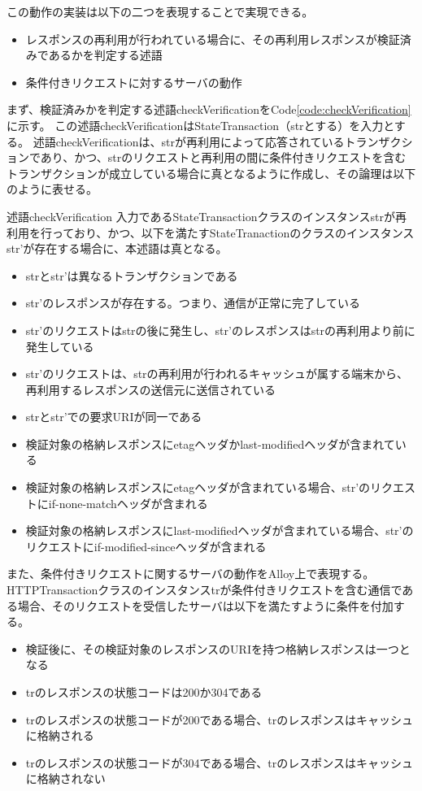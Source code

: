 \documentclass[journal]{IEEEtran}
\begin{document}
この動作の実装は以下の二つを表現することで実現できる。
\begin{itemize}
\item レスポンスの再利用が行われている場合に、その再利用レスポンスが検証済みであるかを判定する述語
\item 条件付きリクエストに対するサーバの動作
\end{itemize}

まず、検証済みかを判定する述語checkVerificationをCode\ref{code:checkVerification}に示す。
この述語checkVerificationはStateTransaction（strとする）を入力とする。
述語checkVerificationは、strが再利用によって応答されているトランザクションであり、かつ、strのリクエストと再利用の間に条件付きリクエストを含むトランザクションが成立している場合に真となるように作成し、その論理は以下のように表せる。

\begin{itembox}[l]{述語checkVerification}
入力であるStateTransactionクラスのインスタンスstrが再利用を行っており、かつ、以下を満たすStateTranactionのクラスのインスタンスstr'が存在する場合に、本述語は真となる。
\begin{itemize}
\item strとstr'は異なるトランザクションである
\item str'のレスポンスが存在する。つまり、通信が正常に完了している
\item str'のリクエストはstrの後に発生し、str'のレスポンスはstrの再利用より前に発生している
\item str'のリクエストは、strの再利用が行われるキャッシュが属する端末から、再利用するレスポンスの送信元に送信されている
\item strとstr'での要求URIが同一である
\item 検証対象の格納レスポンスにetagヘッダかlast-modifiedヘッダが含まれている
\item 検証対象の格納レスポンスにetagヘッダが含まれている場合、str'のリクエストにif-none-matchヘッダが含まれる
\item 検証対象の格納レスポンスにlast-modifiedヘッダが含まれている場合、str'のリクエストにif-modified-sinceヘッダが含まれる
\end{itemize}
\end{itembox}

また、条件付きリクエストに関するサーバの動作をAlloy上で表現する。
HTTPTransactionクラスのインスタンスtrが条件付きリクエストを含む通信である場合、そのリクエストを受信したサーバは以下を満たすように条件を付加する。
\begin{itemize}
\item 検証後に、その検証対象のレスポンスのURIを持つ格納レスポンスは一つとなる
\item trのレスポンスの状態コードは200か304である
\item trのレスポンスの状態コードが200である場合、trのレスポンスはキャッシュに格納される
\item trのレスポンスの状態コードが304である場合、trのレスポンスはキャッシュに格納されない
\end{itemize}
\end{document}
